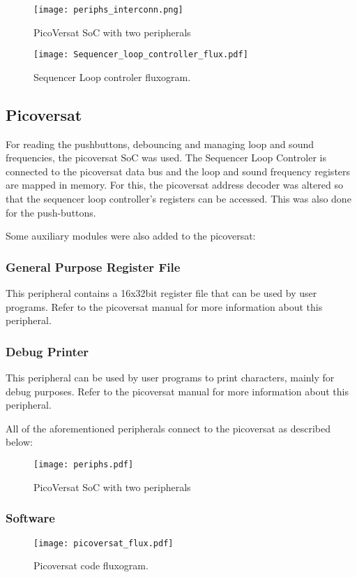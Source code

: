     \begin{figure}[!htbp]
      \centerline{\texttt{[image: periphs\_interconn.png]}}
      \vspace{0cm}\caption{PicoVersat SoC with two peripherals}
      \label{fig:periphs}
  \end{figure}

\begin{figure}[!htbp]
  \centerline{\texttt{[image: Sequencer\_loop\_controller\_flux.pdf]}}
  \vspace{0cm}\caption{Sequencer Loop controler fluxogram.}
  \label{fig:bd}
\end{figure}


\subsection{Picoversat}

For reading the pushbuttons, debouncing and managing loop and sound frequencies, the picoversat SoC was used. The Sequencer Loop Controler is connected to the picoversat data bus and the loop and sound frequency registers are mapped in memory. For this, the picoversat address decoder was altered so that the sequencer loop controller's registers can be accessed. This was also done for the push-buttons.

Some auxiliary modules were also added to the picoversat:

\subsubsection{General Purpose Register File}

This peripheral contains a 16x32bit register file that can be used by user
programs. Refer to the picoversat manual for more information about this peripheral. 


\subsubsection{Debug Printer}

This peripheral can be used by user programs to print characters, mainly for
debug purposes. Refer to the picoversat manual for more information about this peripheral.


All of the aforementioned peripherals connect to the picoversat as described below:

\begin{figure}[!htbp]
  \centerline{\texttt{[image: periphs.pdf]}}
  \vspace{0cm}\caption{PicoVersat SoC with two peripherals}
  \label{fig:periphs}
\end{figure}


\subsubsection{Software}



\begin{figure}[htbp]
  \centerline{\texttt{[image: picoversat\_flux.pdf]}}
  \vspace{0cm}\caption{Picoversat code fluxogram.}
  \label{fig:fluxloop}
\end{figure}

